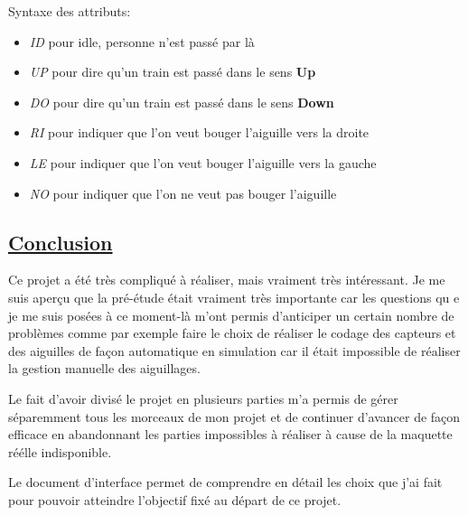 \medskip

Syntaxe des attributs:

\begin{itemize}
  \item \emph{ID} pour idle, personne n'est passé par là
  \item \emph{UP} pour dire qu'un train est passé dans le sens \textbf{Up}
  \item \emph{DO} pour dire qu'un train est passé dans le sens \textbf{Down}    
  \item \emph{RI} pour indiquer que l'on veut bouger l'aiguille vers la
    droite
  \item \emph{LE} pour indiquer que l'on veut bouger l'aiguille vers la
    gauche
  \item \emph{NO} pour indiquer que l'on ne veut pas bouger l'aiguille       
\end{itemize}

\newpage

\subsection{\underline{Conclusion}}
\label{sec:Conclusion}

\bigskip

Ce projet a été très compliqué à réaliser, mais vraiment très
intéressant.
Je me  suis aperçu que la pré-étude était vraiment très
importante car les questions qu e je me suis posées à ce moment-là
m'ont permis d'anticiper un certain nombre de  problèmes comme par
exemple faire le choix de réaliser le codage des capteurs et des
aiguilles de façon automatique en simulation car il était impossible
de réaliser la gestion manuelle des aiguillages.

\smallskip

Le fait d'avoir divisé le projet en plusieurs parties m'a permis de
gérer  séparemment tous les morceaux de mon  projet et de continuer d'avancer
de façon efficace en abandonnant les parties impossibles à réaliser à
cause de la  maquette réélle indisponible.

Le document d'interface permet de comprendre en détail les choix que j'ai fait
pour pouvoir atteindre l'objectif fixé au départ de ce projet.


\newpage





